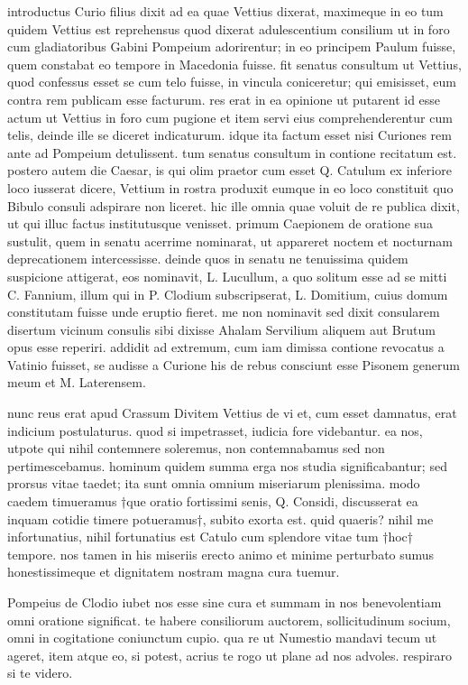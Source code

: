  introductus Curio filius dixit ad ea quae Vettius dixerat, maximeque in eo tum quidem Vettius est reprehensus quod dixerat adulescentium consilium ut in foro cum gladiatoribus Gabini Pompeium adorirentur; in eo principem Paulum fuisse, quem constabat eo tempore in Macedonia fuisse. fit senatus consultum ut Vettius, quod confessus esset se cum telo fuisse, in vincula coniceretur; qui emisisset, eum contra rem publicam esse facturum. res erat in ea opinione ut putarent id esse actum ut Vettius in foro cum pugione et item servi eius comprehenderentur cum telis, deinde ille se diceret indicaturum. idque ita factum esset nisi Curiones rem ante ad Pompeium detulissent. tum senatus consultum in contione recitatum est. postero autem die Caesar, is qui olim praetor cum esset Q. Catulum ex inferiore loco iusserat dicere, Vettium in rostra produxit eumque in eo loco constituit quo Bibulo consuli adspirare non liceret. hic ille omnia quae voluit de re publica dixit, ut qui illuc factus institutusque venisset. primum Caepionem de oratione sua sustulit, quem in senatu acerrime nominarat, ut appareret noctem et nocturnam deprecationem intercessisse. deinde quos in senatu ne tenuissima quidem suspicione attigerat, eos nominavit, L. Lucullum, a quo solitum esse ad se mitti C. Fannium, illum qui in P. Clodium subscripserat, L. Domitium, cuius domum constitutam fuisse unde eruptio fieret. me non nominavit sed dixit consularem disertum vicinum consulis sibi dixisse Ahalam Servilium aliquem aut Brutum opus esse reperiri. addidit ad extremum, cum iam dimissa contione revocatus a Vatinio fuisset, se audisse a Curione his de rebus consciunt esse Pisonem generum meum et M. Laterensem.

 nunc reus erat apud Crassum Divitem Vettius de vi et, cum esset damnatus, erat indicium postulaturus. quod si impetrasset, iudicia fore videbantur. ea nos, utpote qui nihil contemnere soleremus, non contemnabamus sed non pertimescebamus. hominum quidem summa erga nos studia significabantur; sed prorsus vitae taedet; ita sunt omnia omnium miseriarum plenissima. modo caedem timueramus †que oratio fortissimi senis, Q. Considi, discusserat ea inquam cotidie timere potueramus†, subito exorta est. quid quaeris? nihil me infortunatius, nihil fortunatius est Catulo cum splendore vitae tum †hoc† tempore. nos tamen in his miseriis erecto animo et minime perturbato sumus honestissimeque et dignitatem nostram magna cura tuemur.

 Pompeius de Clodio iubet nos esse sine cura et summam in nos benevolentiam omni oratione significat. te habere consiliorum auctorem, sollicitudinum socium, omni in cogitatione coniunctum cupio. qua re ut Numestio mandavi tecum ut ageret, item atque eo, si potest, acrius te rogo ut plane ad nos advoles. respiraro si te videro.
